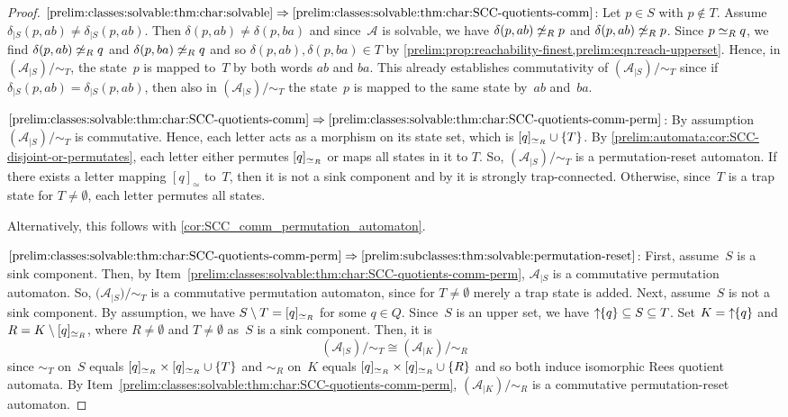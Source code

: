 \begin{proof}
$\ref{prelim:classes:solvable:thm:char:solvable} \Rightarrow \ref{prelim:classes:solvable:thm:char:SCC-quotients-comm}$: 	
Let $p \in S$ with $p \notin T$. Assume $\delta_{|S}(p, ab) \ne \delta_{|S}(p, ab)$.
Then $\delta(p, ab) \ne \delta(p, ba)$
and since~$\mathcal A$
is solvable, we have $\delta(p, ab) \not\simeq_R p$ and $\delta(p, ab) \not\simeq_R p$.
Since $p \simeq_R q$, we find $\delta(p, ab) \not\simeq_R q$ 
and  $\delta(p, ba) \not\simeq_R q$ 
and so $\delta(p, ab) , \delta(p, ba)\in T$ by \cref{prelim:prop:reachability-finest,prelim:eqn:reach-upperset}.
Hence, in $(\mathcal A_{|S} ) / {\sim_T}$,
the state~$p$ is mapped to~$T$ by both words $ab$ and $ba$.
This already establishes commutativity
of $(\mathcal A_{|S} ) / {\sim_T}$
since if  $\delta_{|S}(p, ab) = \delta_{|S}(p, ab)$,
then also in $(\mathcal A_{|S} ) / {\sim_T}$
the state~$p$ is mapped to the same state
by~$ab$ and~$ba$.

$\ref{prelim:classes:solvable:thm:char:SCC-quotients-comm} \Rightarrow \ref{prelim:classes:solvable:thm:char:SCC-quotients-comm-perm}$: 	
By assumption~$(\mathcal A_{|S} ) / {\sim_T}$
is commutative. Hence, each letter acts as a morphism 
on its state set, which is $[q]_{\simeq_R} \cup \{T\}$.
By \cref{prelim:automata:cor:SCC-disjoint-or-permutates},
each letter either permutes $[q]_{\simeq_R}$ 
or maps all states in it to $T$. So,
$(\mathcal A_{|S} ) / {\sim_T}$
is a permutation-reset automaton.
If there exists a letter mapping $[q]_{\simeq}$
to~$T$, then it is not a sink component
and by 
it is strongly trap-connected.
Otherwise, since~$T$ is a trap state for $T \ne \emptyset$,
each letter permutes all states.

Alternatively, this follows with \cref{cor:SCC_comm_permutation_automaton}.

$\ref{prelim:classes:solvable:thm:char:SCC-quotients-comm-perm} \Rightarrow \ref{prelim:subclasses:thm:solvable:permutation-reset}$:
First, assume~$S$ is a sink component.
Then, by Item~\ref{prelim:classes:solvable:thm:char:SCC-quotients-comm-perm},
$\mathcal A_{|S}$ is a commutative permutation automaton.
So, $\mathcal (\mathcal A_{|S}) / {\sim_T}$
is a commutative permutation automaton, since for $T \ne \emptyset$ 
merely a trap state is added.
Next, assume~$S$ is not a sink component. 
By assumption, we have $S \setminus T = [q]_{\simeq_R}$
for some $q \in Q$. Since~$S$ is an upper set, we have 
$\mbox{\ensuremath{\displaystyle \uparrow \!\!\{q\}}} \subseteq S \subseteq T$. 
Set $K = \mbox{\ensuremath{\displaystyle \uparrow \!\!\{q\}}}$ and $R = K \setminus [q]_{\simeq_R}$,
where $R \ne \emptyset$ and $T \ne \emptyset$
as~$S$ is a sink component.
Then, it is
\[
 ( \mathcal A_{|S} ) / {\sim_T}
 \cong 
 ( \mathcal A_{|K} ) / {\sim_{R}}
\]
since $\sim_T$ on~$S$
equals $[q]_{\simeq_R} \times [q]_{\simeq_R} \cup \{ T \}$
and $\sim_R$ on~$K$ equals $[q]_{\simeq_R} \times [q]_{\simeq_R} \cup \{ R \}$
and so both induce isomorphic Rees quotient automata.
By Item~\ref{prelim:classes:solvable:thm:char:SCC-quotients-comm-perm},
$( \mathcal A_{|K} ) / {\sim_{R}}$
is a commutative permutation-reset automaton.


\end{proof}
